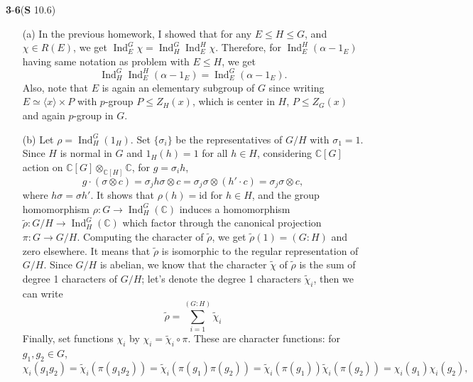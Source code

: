 \documentclass[a4paper, 12pt]{article}
\theoremstyle{Mydefinition}
\theoremstyle{Mytheorem}
\DeclareMathOperator{\Ind}{Ind}
\begin{document}
\noindent \textbf{3}-\textbf{6}(\textbf{S} 10.6)
\begin{enumerate}
    \item[(a)] In the previous homework, I showed that for any $E\leq H\leq G$, and $\chi\in R(E)$, we get $\Ind_E^G \chi = \Ind_H^G\Ind_E^H \chi$. Therefore, for $\Ind_E^H(\alpha-1_E)$ having same notation as problem with $E\leq H$, we get
    \begin{equation}
        \Ind_H^G\Ind_E^H(\alpha-1_E) = \Ind_E^G(\alpha-1_E).
    \end{equation}
    Also, note that $E$ is again an elementary subgroup of $G$ since writing $E \simeq \langle x\rangle \times P$ with $p$-group $P\leq Z_H(x)$, which is center in $H$, $P\leq Z_G(x)$ and again $p$-group in $G$.
    \item[(b)] Let $\rho = \Ind_H^G(1_H)$. Set $\{\sigma_i\}$ be the representatives of $G/H$ with $\sigma_1 = 1$. Since $H$ is normal in $G$ and $1_H(h) = 1$ for all $h\in H$, considering $\mathbb{C}[G]$ action on $\mathbb{C}[G]\otimes_{\mathbb{C}[H]}\mathbb{C}$, for $g =\sigma_i h$,
    \begin{equation}
        g\cdot(\sigma \otimes c) = \sigma_j h \sigma \otimes c = \sigma_j \sigma \otimes (h'\cdot c) = \sigma_j\sigma \otimes c,
    \end{equation}
    where $h\sigma = \sigma h'$. It shows that $\rho(h)=\mathrm{id}$ for $h\in H$, and the group homomorphism $\rho:G\rightarrow \Ind_H^G(\mathbb{C})$ induces a homomorphism $\tilde{\rho}:G/H\rightarrow \Ind_H^G(\mathbb{C})$ which factor through the canonical projection $\pi:G\rightarrow G/H$. Computing the character of $\tilde{\rho}$, we get $\tilde{\rho}(1) = (G:H)$ and zero elsewhere. It means that $\tilde{\rho}$ is isomorphic to the regular representation of $G/H$. Since $G/H$ is abelian, we know that the character $\tilde{\chi}$ of $\tilde{\rho}$ is the sum of degree 1 characters of $G/H$; let's denote the degree 1 characters $\tilde{\chi}_i$, then we can write
    \begin{equation}
        \tilde{\rho} = \sum_{i=1}^{(G:H)}\tilde{\chi}_i
    \end{equation}
    Finally, set functions $\chi_i$ by $\chi_i = \tilde{\chi}_i\circ \pi$. These are character functions: for $g_1,g_2\in G$,
    \begin{equation}
        \chi_i(g_1g_2) = \tilde{\chi}_i\left(\pi(g_1g_2)\right) = \tilde{\chi}_i\left(\pi(g_1)\pi(g_2)\right) = \tilde{\chi}_i(\pi(g_1))\tilde{\chi}_i(\pi(g_2)) = \chi_i(g_1)\chi_i(g_2),
    \end{equation}

\end{enumerate}
\end{document}

